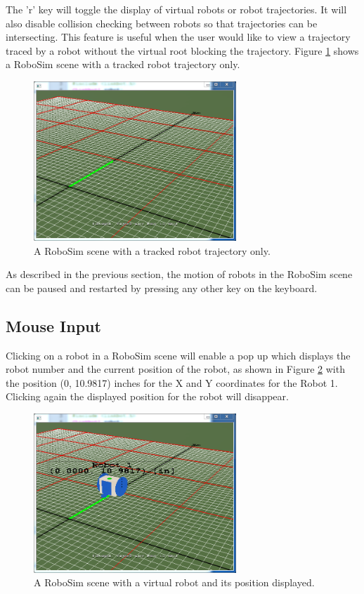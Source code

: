 \documentclass{article}
\begin{document}
The 'r' key will toggle the display of virtual robots or robot trajectories.  It
will also disable collision checking between robots so that trajectories can be
intersecting.  This feature is useful when the user would like to view a
trajectory traced by a robot without the virtual root blocking the trajectory.
Figure \ref{fig:robosim_norobot} shows a RoboSim scene with a tracked robot
trajectory only.
\begin{figure}[H]
	\begin{center}
		\includegraphics[width=3in]{images/robosim_norobot}
	\end{center}
	\caption{A RoboSim scene with a tracked robot trajectory only.}
	\label{fig:robosim_norobot}
\end{figure}

As described in the previous section, the motion of robots in the RoboSim scene
can be paused and restarted by pressing any other key on the keyboard.

\subsection{Mouse Input}
Clicking on a robot in a RoboSim scene will enable a pop up which displays the
robot number and the current position of the robot, as shown in Figure
\ref{fig:robosim_pos} with the position (0, 10.9817) inches for the X and Y
coordinates for the Robot 1.  Clicking again the displayed position for the
robot will disappear.
\begin{figure}[H]
	\begin{center}
		\includegraphics[width=3in]{images/robosim_pos}
	\end{center}
	\caption{A RoboSim scene with a virtual robot and its position displayed.}
	\label{fig:robosim_pos}
\end{figure}
\end{document}
